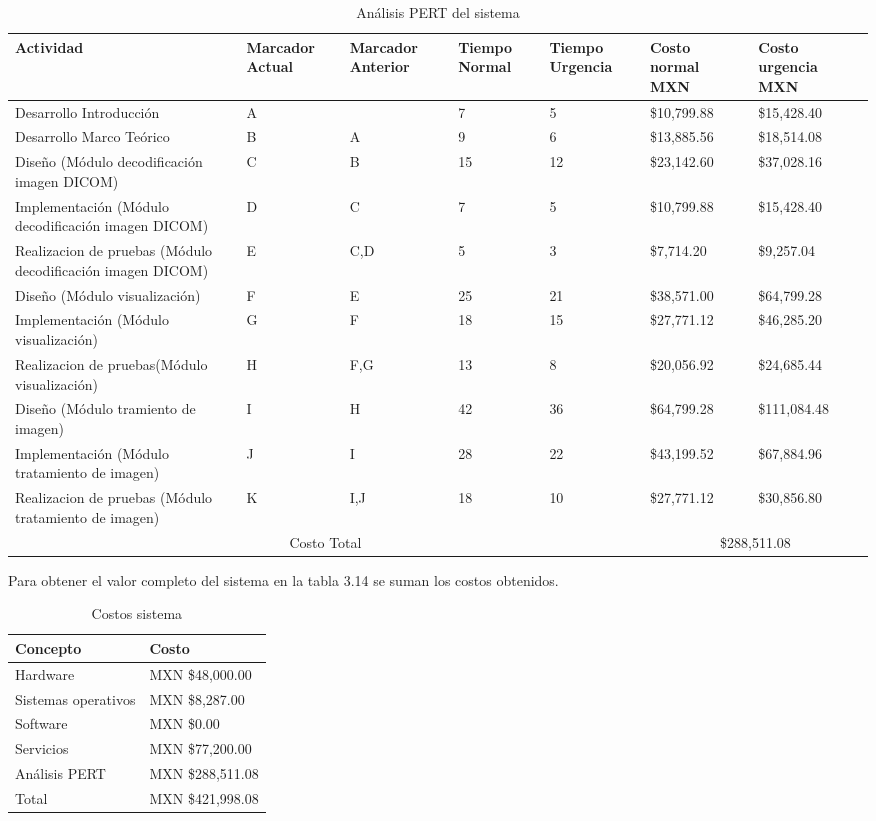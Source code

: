 \documentclass[12pt]{report}
\begin{document}
\begin{table}[H]
\scriptsize
\begin{center}
\begin{tabular}{|p{2.5cm}|p{1.5cm}|p{1.5cm}|p{1.5cm}|p{1.5cm}|p{1.5cm}|p{1.5cm}|}
\hline
Actividad & Marcador Actual & Marcador Anterior & Tiempo Normal & Tiempo Urgencia & Costo normal MXN & Costo urgencia MXN\\ 
\hline \hline
Desarrollo Introducción & A & & 7 & 5 &  \$10,799.88 &  \$15,428.40 \\
\hline
Desarrollo Marco Teórico & B & A & 9 & 6 &  \$13,885.56 &  \$18,514.08 \\
\hline
Diseño (Módulo decodificación imagen DICOM) & C & B & 15 & 12 &  \$23,142.60 &  \$37,028.16\\
\hline
Implementación (Módulo decodificación imagen DICOM) & D & C & 7 & 5 &  \$10,799.88 &  \$15,428.40 \\
\hline
Realizacion de pruebas (Módulo decodificación imagen DICOM) & E & C,D & 5 & 3 &  \$7,714.20 &  \$9,257.04\\ 
\hline
Diseño (Módulo visualización) & F & E & 25 & 21 &  \$38,571.00 &   \$64,799.28\\
\hline
Implementación (Módulo visualización) & G & F & 18 & 15 &  \$27,771.12 &  \$46,285.20\\
\hline
Realizacion de pruebas(Módulo visualización) & H & F,G & 13 & 8 &  \$20,056.92 &  \$24,685.44\\
\hline
Diseño (Módulo tramiento de imagen) & I & H & 42 & 36 &  \$64,799.28 &  \$111,084.48\\ 
\hline
Implementación (Módulo tratamiento de imagen) & J & I & 28 & 22 &  \$43,199.52 &  \$67,884.96\\
\hline
Realizacion de pruebas (Módulo tratamiento de imagen) & K & I,J & 18 & 10 &  \$27,771.12 &  \$30,856.80\\
\hline
\multicolumn{5}{|c|}{Costo Total} & \multicolumn{2}{|c|}{\$288,511.08}\\
\hline
\end{tabular}
\caption{Análisis PERT del sistema}
\end{center}
\end{table}

Para obtener el valor  completo del sistema en la tabla 3.14 se suman los costos obtenidos.
\begin{table}[H]
\begin{center}
\begin{tabular}{p{40mm}p{40mm}}
\hline
Concepto & Costo\\
\hline \hline 
Hardware & MXN \$48,000.00\\
Sistemas operativos &  MXN \$8,287.00\\
Software & MXN \$0.00\\
Servicios & MXN \$77,200.00\\
Análisis PERT & MXN \$288,511.08\\
\hline \hline
Total & MXN \$421,998.08\\
\hline
\end{tabular}
\caption{Costos sistema}
\end{center}
\end{table}
\end{document}
